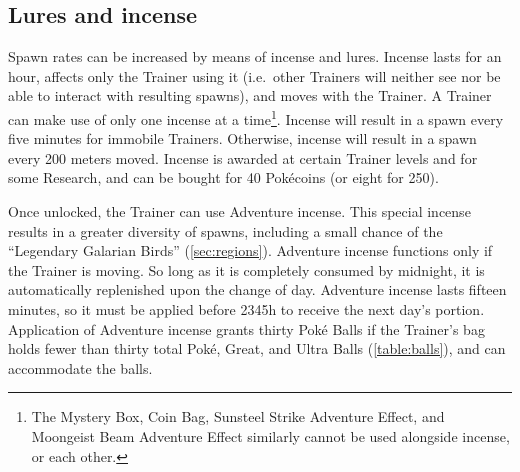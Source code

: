 \subsection{Lures and incense\label{subsec:lures}}
Spawn rates can be increased by means of incense and lures.
Incense lasts for an hour, affects only the Trainer using it (i.e.\ other Trainers
  will neither see nor be able to interact with resulting spawns),
  and moves with the Trainer.
A Trainer can make use of only one incense at a time\footnote{The
  Mystery Box, Coin Bag, Sunsteel Strike Adventure Effect, and
  Moongeist Beam Adventure Effect similarly cannot be used
  alongside incense, or each other.}.
Incense will result in a spawn every five minutes for immobile Trainers.
Otherwise, incense will result in a spawn every 200 meters moved.
Incense is awarded at certain Trainer levels and for some Research,
  and can be bought for 40 Pokécoins (or eight for 250).

Once unlocked, the Trainer can use Adventure incense.
This special incense results in a greater diversity of spawns, including
  a small chance of the ``Legendary Galarian Birds'' (\autoref{sec:regions}).
Adventure incense functions only if the Trainer is moving.
So long as it is completely consumed by midnight, it is automatically replenished
  upon the change of day.
Adventure incense lasts fifteen minutes, so it must be applied before 2345h
  to receive the next day's portion.
Application of Adventure incense grants thirty Poké Balls if the Trainer's
  bag holds fewer than thirty total Poké, Great, and Ultra Balls (\autoref{table:balls}),
  and can accommodate the balls.

